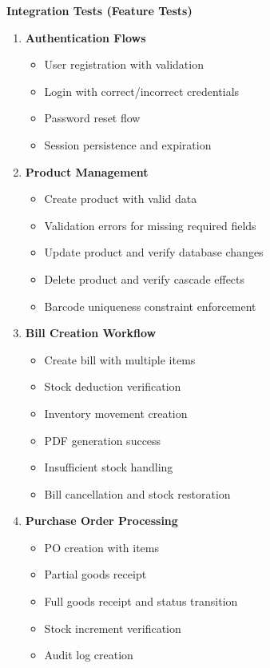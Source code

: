 \textbf{Integration Tests (Feature Tests)}

\begin{enumerate}[leftmargin=*]
    \item \textbf{Authentication Flows}
    \begin{itemize}
        \item User registration with validation
        \item Login with correct/incorrect credentials
        \item Password reset flow
        \item Session persistence and expiration
    \end{itemize}
    
    \item \textbf{Product Management}
    \begin{itemize}
        \item Create product with valid data
        \item Validation errors for missing required fields
        \item Update product and verify database changes
        \item Delete product and verify cascade effects
        \item Barcode uniqueness constraint enforcement
    \end{itemize}
    
    \item \textbf{Bill Creation Workflow}
    \begin{itemize}
        \item Create bill with multiple items
        \item Stock deduction verification
        \item Inventory movement creation
        \item PDF generation success
        \item Insufficient stock handling
        \item Bill cancellation and stock restoration
    \end{itemize}
    
    \item \textbf{Purchase Order Processing}
    \begin{itemize}
        \item PO creation with items
        \item Partial goods receipt
        \item Full goods receipt and status transition
        \item Stock increment verification
        \item Audit log creation
    \end{itemize}
    

\end{enumerate}
